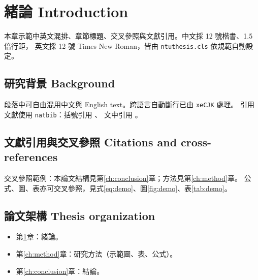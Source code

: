 \chapter{緒論 Introduction}
\label{ch:intro}

本章示範中英文混排、章節標題、交叉參照與文獻引用。中文採 12 號楷書、1.5 倍行距，
英文採 12 號 Times New Roman，皆由 \texttt{ntuthesis.cls} 依規範自動設定。

\section{研究背景 Background}
段落中可自由混用中文與 English text。跨語言自動斷行已由 \texttt{xeCJK} 處理。
引用文獻使用 \texttt{natbib}：括號引用 \citep{knuth1984texbook}、
文中引用 \citet{lamport1994latex}。

\section{文獻引用與交叉參照 Citations and cross-references}
交叉參照範例：本論文結構見第\ref{ch:conclusion}章；方法見第\ref{ch:method}章。
公式、圖、表亦可交叉參照，見式\eqref{eq:demo}、圖\ref{fig:demo}、表\ref{tab:demo}。

\section{論文架構 Thesis organization}
\begin{itemize}
  \item 第\ref{ch:intro}章：緒論。
  \item 第\ref{ch:method}章：研究方法（示範圖、表、公式）。
  \item 第\ref{ch:conclusion}章：結論。
\end{itemize}
